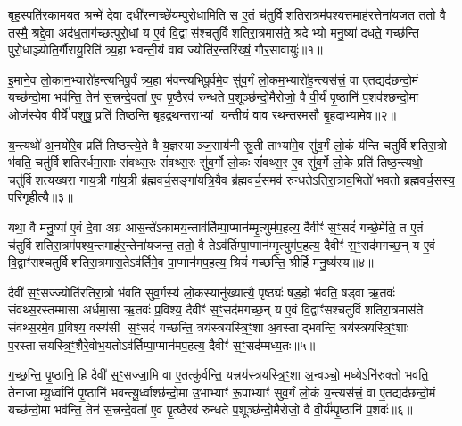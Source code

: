 \setcounter{anuvakam}{0}
बृह॒स्पति॑रकामयत॒ श्रन्मे॑ दे॒वा दधी॑र॒न्गच्छे॑यम्पुरो॒धामिति॒ स ए॒तं च॑तुर्विशतिरा॒त्रम॑पश्य॒त्तमाह॑र॒त्तेना॑यजत॒ ततो॒ वै तस्मै॒ श्रद्दे॒वा अद॑ध॒ताग॑च्छत्पुरो॒धां य ए॒वं वि॒द्वास॑श्चतुर्विशतिरा॒त्रमास॑ते॒ श्रदेभ्यो मनु॒ष्या॑ दधते॒ गच्छ॑न्ति पुरो॒धाञ्ज्योति॒र्गौरायु॒रिति॑ त्र्य॒हा भ॑वन्ती॒यं वाव ज्योति॑र॒न्तरि॑ख्षं॒ गौर॒सावायुः॑॥१॥

इ॒माने॒व लो॒कान॒भ्यारो॑हन्त्यभिपू॒र्वं त्र्य॒हा भ॑वन्त्यभिपू॒र्वमे॒व सु॑व॒र्गं लो॒कम॒भ्यारो॑ह॒न्त्यस॑त्त्रं॒ वा ए॒तद्यद॑छन्दो॒मं यच्छ॑न्दो॒मा भव॑न्ति॒ तेन॑ स॒त्त्रन्दे॒वता॑ ए॒व पृ॒ष्ठैरव॑ रुन्धते प॒शूञ्छ॑न्दो॒मैरोजो॒ वै वी॒र्यं॑ पृ॒ष्ठानि॑ प॒शव॑श्छन्दो॒मा ओज॑स्ये॒व वी॒र्ये॑ प॒शुषु॒ प्रति॑ तिष्ठन्ति बृहद्रथन्त॒राभ्यां यन्ती॒यं वाव र॑थन्त॒रम॒सौ बृ॒हदा॒भ्यामे॒व॥२॥

य॒न्त्यथो॑ अ॒नयो॑रे॒व प्रति॑ तिष्ठन्त्ये॒ते वै य॒ज्ञस्याञ्ज॒साय॑नी स्रु॒ती ताभ्या॑मे॒व सु॑व॒र्गं लो॒कं य॑न्ति चतुर्विशतिरा॒त्रो भ॑वति॒ चतु॑र्विशतिरर्धमा॒साः सं॑वथ्स॒रः सं॑वथ्स॒रः सु॑व॒र्गो लो॒कः सं॑वथ्स॒र ए॒व सु॑व॒र्गे लो॒के प्रति॑ तिष्ठ॒न्त्यथो॒ चतु॑र्विशत्यख्षरा गाय॒त्री गा॑य॒त्री ब्र॑ह्मवर्च॒सङ्गा॑यत्रि॒यैव ब्र॑ह्मवर्च॒समव॑ रुन्धतेऽतिरा॒त्राव॒भितो॑ भवतो ब्रह्मवर्च॒सस्य॒ परि॑गृहीत्यै॥३॥

{\anuvakamend[{अ॒सावायु॑रा॒भ्यामे॒व पञ्च॑चत्वारिशच्च॥१॥}]}

यथा॒ वै म॑नु॒ष्या॑ ए॒वं दे॒वा अग्र॑ आस॒न्ते॑ऽकामय॒न्ताव॑र्तिम्पा॒प्मान॑म्मृ॒त्युम॑प॒हत्य॒ दैवीꣳ॑ स॒ꣳ॒सदं॑ गच्छे॒मेति॒ त ए॒तं च॑तुर्विशतिरा॒त्रम॑पश्य॒न्तमाह॑र॒न्तेना॑यजन्त॒ ततो॒ वै तेऽव॑र्तिम्पा॒प्मान॑म्मृ॒त्युम॑प॒हत्य॒ दैवीꣳ॑ स॒ꣳ॒सद॑मगच्छ॒न् य ए॒वं वि॒द्वाꣳ॑सश्चतुर्विशतिरा॒त्रमास॒तेऽव॑र्तिमे॒व पा॒प्मान॑मप॒हत्य॒ श्रियं॑ गच्छन्ति॒ श्रीर्\mbox{}हि म॑नु॒ष्य॑स्य॥४॥

दैवी॑ स॒ꣳ॒सज्ज्योति॑रतिरा॒त्रो भ॑वति सुव॒र्गस्य॑ लो॒कस्यानु॑ख्यात्यै॒ पृष्ठ्यः॑ षड॒हो भ॑वति॒ षड्वा ऋ॒तवः॑ संवथ्स॒रस्तम्मासा॑ अर्धमा॒सा ऋ॒तवः॑ प्र॒विश्य॒ दैवीꣳ॑ स॒ꣳ॒सद॑मगच्छ॒न् य ए॒वं वि॒द्वाꣳ॑सश्चतुर्विशतिरा॒त्रमास॑ते संवथ्स॒रमे॒व प्र॒विश्य॒ वस्य॑सी स॒ꣳ॒सदं॑ गच्छन्ति॒ त्रय॑स्त्रयस्त्रि॒ꣳ॒शा अ॒वस्ताद्भवन्ति॒ त्रय॑स्त्रयस्त्रि॒ꣳ॒शाः प॒रस्तात्त्रयस्त्रि॒ꣳ॒शैरे॒वोभ॒यतोऽव॑र्तिम्पा॒प्मान॑मप॒हत्य॒ दैवीꣳ॑ स॒ꣳ॒सद॑म्मध्य॒तः॥५॥

ग॒च्छ॒न्ति॒ पृ॒ष्ठानि॒ हि दैवी॑ स॒ꣳ॒सज्जा॒मि वा ए॒तत्कु॑र्वन्ति॒ यत्त्रय॑स्त्रयस्त्रि॒ꣳ॒शा अ॒न्वञ्चो॒ मध्येऽनि॑रुक्तो भवति॒ तेनाजाम्यू॒र्ध्वानि॑ पृ॒ष्ठानि॑ भवन्त्यू॒र्ध्वाश्छ॑न्दो॒मा उ॒भाभ्याꣳ॑ रू॒पाभ्याꣳ॑ सुव॒र्गं लो॒कं य॒न्त्यस॑त्त्रं॒ वा ए॒तद्यद॑छन्दो॒मं यच्छ॑न्दो॒मा भव॑न्ति॒ तेन॑ स॒त्त्रन्दे॒वता॑ ए॒व पृ॒त्ष्ठैरव॑ रुन्धते प॒शूञ्छ॑न्दो॒मैरोजो॒ वै वी॒र्य॑म्पृ॒ष्ठानि॑ प॒शवः॑॥६॥


